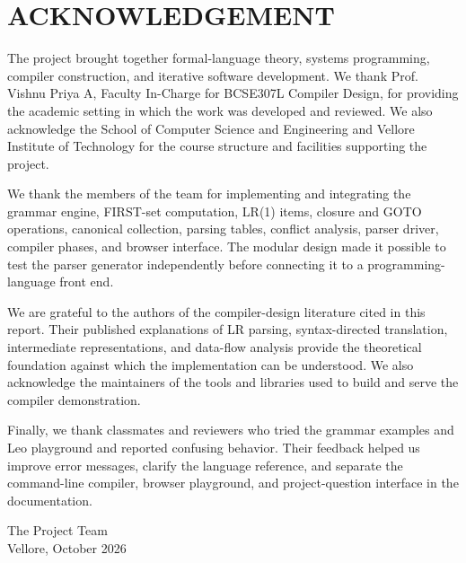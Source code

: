 \documentclass[12pt,a4paper,oneside]{report}
\begin{document}
\chapter*{ACKNOWLEDGEMENT}
The project brought together formal-language theory, systems programming, compiler construction, and iterative software development. We thank Prof. Vishnu Priya A, Faculty In-Charge for BCSE307L Compiler Design, for providing the academic setting in which the work was developed and reviewed. We also acknowledge the School of Computer Science and Engineering and Vellore Institute of Technology for the course structure and facilities supporting the project.\par
\vspace{0.35cm}
We thank the members of the team for implementing and integrating the grammar engine, FIRST-set computation, LR(1) items, closure and GOTO operations, canonical collection, parsing tables, conflict analysis, parser driver, compiler phases, and browser interface. The modular design made it possible to test the parser generator independently before connecting it to a programming-language front end.\par
\vspace{0.35cm}
We are grateful to the authors of the compiler-design literature cited in this report. Their published explanations of LR parsing, syntax-directed translation, intermediate representations, and data-flow analysis provide the theoretical foundation against which the implementation can be understood. We also acknowledge the maintainers of the tools and libraries used to build and serve the compiler demonstration.\par
\vspace{0.35cm}
Finally, we thank classmates and reviewers who tried the grammar examples and Leo playground and reported confusing behavior. Their feedback helped us improve error messages, clarify the language reference, and separate the command-line compiler, browser playground, and project-question interface in the documentation.
\vfill
\begin{flushright}
The Project Team\\
Vellore, October 2026
\end{flushright}
\clearpage

\tableofcontents
\clearpage
\listoftables
{}
\clearpage
\listoffigures
{}
\clearpage
\end{document}
